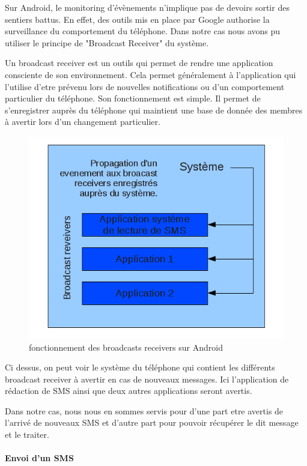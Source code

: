 Sur Android, le monitoring d'évènements n'implique pas de devoirs sortir des sentiers battus. En effet,
des outils mis en place par Google authorise la surveillance du comportement du téléphone. Dans notre cas 
nous avons pu utiliser le principe de "Broadcast Receiver" du système. 

Un broadcast receiver est un outils qui permet de rendre une application consciente de son environnement.
Cela permet généralement à l'application qui l'utilise d'etre prévenu lors de nouvelles notifications ou 
d'un comportement particulier du téléphone.
Son fonctionnement est simple. Il permet de s'enregistrer auprès du téléphone qui maintient une base de donnée des 
membres à avertir lors d'un changement particulier.

\begin{figure}[!h]
	\center
	\includegraphics[width=12cm]{img/broadcast-receivers.png}
	\caption{fonctionnement des broadcasts receivers sur Android}
\end{figure}

Ci dessus, on peut voir le système du téléphone qui contient les différents broadcast receiver à avertir
en cas de nouveaux messages. Ici l'application de rédaction de SMS ainsi que deux autres applications seront
avertis.

Dans notre cas, nous nous en sommes servis pour d'une part etre avertis de l'arrivé de nouveaux SMS et d'autre 
part pour pouvoir récupérer le dit message et le traiter.
\\


\paragraph{Envoi d'un SMS}

